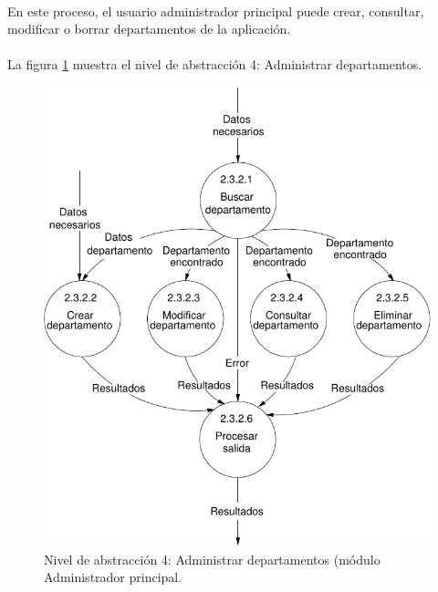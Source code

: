 \paragraph{}En este proceso, el usuario administrador principal puede crear,
consultar, modificar o borrar departamentos de la aplicación.

\paragraph{}La figura \ref{diagramaNivel4-AdministrarDepartamentos}
muestra el nivel de abstracción 4: Administrar departamentos.

  \begin{figure}[!ht]
    \begin{center}
      \includegraphics[]{08.Analisis_Funcional/8.2.DFDs/Niveles/Nivel4/AdministradorPrincipal/AdministrarDepartamentos/Diagramas/nivel4-AdministrarDepartamentos.pdf}
      \caption{Nivel de abstracción 4: Administrar departamentos (módulo Administrador principal.}
      \label{diagramaNivel4-AdministrarDepartamentos}
    \end{center}
  \end{figure}
